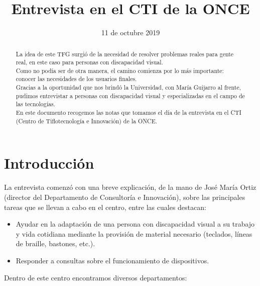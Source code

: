 \documentclass{article}
\title{\Huge Entrevista en el CTI de la ONCE}
\date{11 de octubre 2019}
\begin{document}
	
	\begin{titlepage}
		\maketitle
		\thispagestyle{empty}
	\end{titlepage}
	
	\begin{abstract}
		La idea de este TFG surgió de la necesidad de resolver problemas reales para gente real, en este caso para personas con discapacidad visual.
		\\
		Como no podía ser de otra manera, el camino comienza por lo más importante: conocer las necesidades de los usuarios finales.
		\\
		Gracias a la oportunidad que nos  brindó la Universidad, con María Guijarro al frente, pudimos entrevistar a personas con discapacidad visual y especializadas en el campo de las tecnologías.
		\\
		En este documento recogemos las notas que tomamos el día de la entrevista en el CTI (Centro de Tiflotecnología e Innovación)  de la ONCE.
		
	\end{abstract}
	
	\section{Introducción}
		La entrevista comenzó con una breve explicación, de la mano de José María Ortiz (director del Departamento de Consultoría e Innovación), sobre las principales tareas que se llevan a cabo en el centro, entre las cuales destacan:
	
	 \begin{itemize}
		\item Ayudar en la adaptación  de una persona con discapacidad visual a su trabajo y vida cotidiana mediante la provisión de material necesario (teclados, líneas de braille, bastones, etc.).
		\item Responder a consultas sobre el funcionamiento de dispositivos.
	\end{itemize}
	
	Dentro de este centro encontramos diversos departamentos:
	
\end{document}
